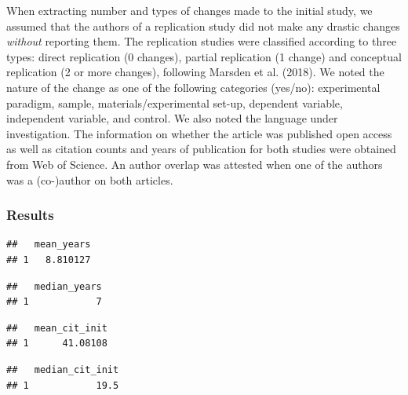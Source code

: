 \documentclass[]{elsarticle} %
\begin{document}
When extracting number and types of changes made to the initial study,
we assumed that the authors of a replication study did not make any
drastic changes \emph{without} reporting them. The replication studies
were classified according to three types: direct replication (0
changes), partial replication (1 change) and conceptual replication (2
or more changes), following Marsden et al. (2018). We noted the nature
of the change as one of the following categories (yes/no): experimental
paradigm, sample, materials/experimental set-up, dependent variable,
independent variable, and control. We also noted the language under
investigation. The information on whether the article was published open
access as well as citation counts and years of publication for both
studies were obtained from Web of Science. An author overlap was
attested when one of the authors was a (co-)author on both articles.

\hypertarget{results-1}{%
\subsubsection{Results}\label{results-1}}

\begin{verbatim}
##   mean_years
## 1   8.810127
\end{verbatim}

\begin{verbatim}
##   median_years
## 1            7
\end{verbatim}

\begin{verbatim}
##   mean_cit_init
## 1      41.08108
\end{verbatim}

\begin{verbatim}
##   median_cit_init
## 1            19.5
\end{verbatim}
\end{document}
